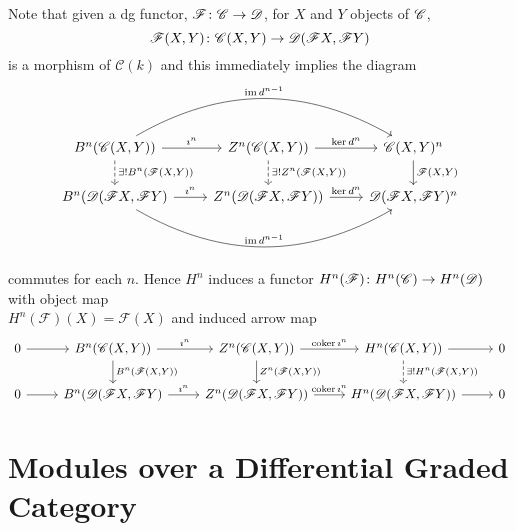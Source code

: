 \documentclass[dissertation.tex]{subfiles}
\begin{document}
\begin{rmk}\label{DGInducedHomology}
  Note that given a dg functor, $\mathscr{F} \colon \mathscr{C} \rightarrow \mathscr{D}$, for $X$ and $Y$ objects of $\mathscr{C}$, 
  $$\mathscr{F}(X,Y) \colon \mathscr{C}(X,Y) \rightarrow \mathscr{D}(\mathscr{F}X, \mathscr{F}Y)$$
  is a morphism of $\mathcal{C}(k)$ and this immediately implies the diagram
  $$\begin{tikzcd}
    B^n(\CC(X,Y))\arrow{r}{\imath^n}\arrow[bend left]{rr}{\im d^{n-1}}\arrow[dashed]{d}{\exists !B^n(\F(X,Y))} & Z^n(\CC(X,Y)) \arrow{r}{\ker d^n}\arrow[dashed]{d}{\exists !Z^n(\F(X,Y))} & \CC(X,Y)^{n} \arrow{d}{\F(X,Y)}\\
    B^n(\D(\F X,\F Y) \arrow{r}{\imath^n}\arrow[bend right]{rr}{\im d^{n-1}} & Z^n(\D(\F X,\F Y))\arrow{r}{\ker d^n} & \D(\F X,\F Y)^{n}
  \end{tikzcd}$$
  commutes for each $n$.
  Hence $H^n$ induces a functor
  $H^n(\mathscr{F}) \colon H^n(\mathscr{C}) \rightarrow H^n(\mathscr{D})$
  with object map\\ $H^n(\mathscr{F})(X) = \mathscr{F}(X)$ and induced arrow map 
  $$\begin{tikzcd}
    0 \arrow{r} & B^n(\CC(X,Y))\arrow{r}{\imath^n}\arrow{d}{B^n(\F(X,Y))} & Z^n(\CC(X,Y)) \arrow{r}{\coker \imath^n}\arrow{d}{Z^n(\F(X,Y))} & H^n(\CC(X,Y)) \arrow[dashed]{d}{\exists !H^n(\F(X,Y))}\arrow{r} & 0 \\
    0 \arrow{r} & B^n(\D(\F X,\F Y) \arrow{r}{\imath^n} & Z^n(\D(\F X,\F Y))\arrow{r}{\coker \imath^n} & H^n(\D(\F X,\F Y)) \arrow{r} & 0
  \end{tikzcd}$$
\end{rmk}

\section{Modules over a Differential Graded Category}
\end{document}
